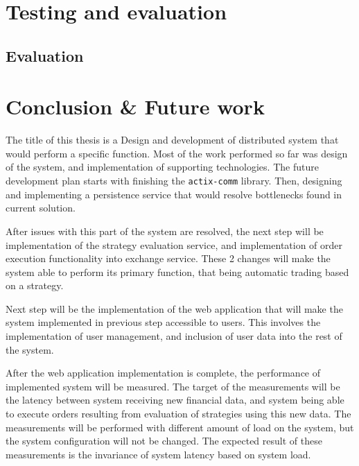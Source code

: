 

\chapter{Testing and evaluation}


\section{Evaluation}


\chapter{Conclusion \& Future work}
The title of this thesis is a Design and development of distributed system that would perform a specific function.
Most of the work performed so far was design of the system, and implementation of supporting technologies. The
future development plan starts with finishing the \verb|actix-comm| library. Then, designing and implementing a persistence
service that would resolve bottlenecks found in current solution.

After issues with this part of the system are resolved, the next step will be implementation of the strategy evaluation service,
and implementation of order execution functionality into exchange service. These 2 changes will make the system able to perform its
primary function, that being automatic trading based on a strategy.

Next step will be the implementation
of the web application that will make the system implemented in previous step accessible to users. This involves the implementation of user management,
and inclusion of user data into the rest of the system.

After the web application implementation is complete, the performance of implemented system will be measured. The target of the measurements
will be the latency between system receiving new financial data, and system being able to execute orders resulting from
evaluation of strategies using this new data. The measurements will be performed with different amount of
load on the system, but the system configuration will not be changed. The expected result of these measurements is the
invariance of system latency based on system load.




